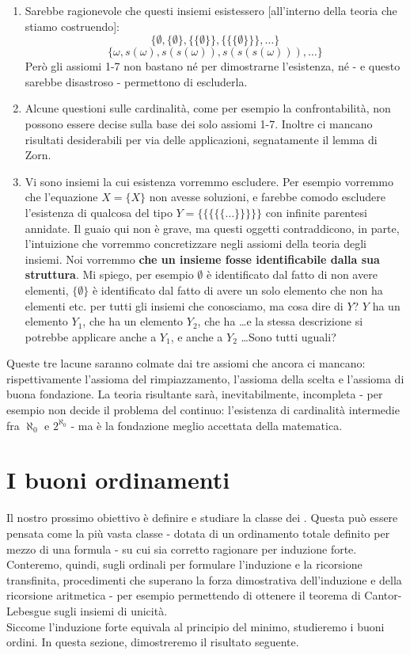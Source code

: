 \documentclass[11pt]{scrartcl}
\begin{document}
\begin{enumerate}[1.]
	\item Sarebbe ragionevole che questi insiemi esistessero [all'interno della teoria che stiamo costruendo]:
	\[ \{\emptyset, \{\emptyset\}, \{\{\emptyset\}\}, \{\{\{\emptyset\}\}\}, \ldots\}
		\]\[ \{\omega, s(\omega), s(s(\omega)), s(s(s(\omega))),\ldots\}
			\]
	Però gli assiomi 1-7 non bastano né per dimostrarne l'esistenza, né - e questo sarebbe disastroso - permettono di escluderla.
	\item Alcune questioni sulle cardinalità, come per esempio la confrontabilità, non possono essere decise sulla base dei solo assiomi 1-7.
	Inoltre ci mancano risultati desiderabili per via delle applicazioni, segnatamente il lemma di Zorn.
	\item Vi sono insiemi la cui esistenza vorremmo escludere. Per esempio vorremmo che l'equazione $X = \{X\}$ non avesse soluzioni, e farebbe comodo escludere 
	l'esistenza di qualcosa del tipo $Y = \{\{\{\{\{\ldots\}\}\}\}\}$ con infinite parentesi annidate. Il guaio qui non è grave, ma questi oggetti contraddicono, in parte, l'intuizione che vorremmo 
	concretizzare negli assiomi della teoria degli insiemi. Noi vorremmo \textbf{che un insieme fosse identificabile dalla sua struttura}. Mi spiego, per esempio $\emptyset$ è identificato dal fatto di non avere elementi,
	$\{\emptyset\}$ è identificato dal fatto di avere un solo elemento che non ha elementi etc. per tutti gli insiemi che conosciamo, ma cosa dire di $Y$? $Y$ ha un elemento $Y_1$, che ha un elemento $Y_2$,
	che ha \ldots e la stessa descrizione si potrebbe applicare anche a $Y_1$, e anche a $Y_2$ \ldots Sono tutti uguali? 
\end{enumerate}

Queste tre lacune saranno colmate dai tre assiomi che ancora ci mancano: rispettivamente l'assioma del rimpiazzamento, l'assioma della scelta e l'assioma di buona fondazione. La teoria risultante sarà,
inevitabilmente, incompleta - per esempio non decide il problema del continuo: l'esistenza di cardinalità intermedie fra $\aleph_0$ e $2^{\aleph_0}$ - ma è la fondazione meglio accettata della matematica.






\newpage
\section{I buoni ordinamenti}
Il nostro prossimo obiettivo è definire e studiare la classe dei . Questa può essere pensata come la più vasta classe
- dotata di un ordinamento totale definito per mezzo di una formula - su cui sia corretto ragionare per induzione forte. Conteremo, quindi, sugli ordinali per formulare 
l'induzione e la ricorsione transfinita, procedimenti che superano la forza dimostrativa dell'induzione e della ricorsione aritmetica - per esempio permettendo di ottenere 
il teorema di Cantor-Lebesgue sugli insiemi di unicità.\\
Siccome l'induzione forte equivala al principio del minimo, studieremo i buoni ordini. In questa sezione, dimostreremo il risultato seguente.
\end{document}
